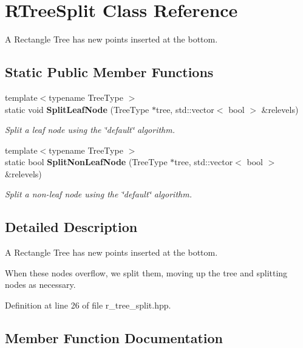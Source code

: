 \section{R\+Tree\+Split Class Reference}
\label{classmlpack_1_1tree_1_1RTreeSplit}


A Rectangle Tree has new points inserted at the bottom.  


\subsection*{Static Public Member Functions}
\begin{DoxyCompactItemize}
\item 
{\footnotesize template$<$typename Tree\+Type $>$ }\\static void \textbf{ Split\+Leaf\+Node} (Tree\+Type $\ast$tree, std\+::vector$<$ bool $>$ \&relevels)
\begin{DoxyCompactList}\small\item\em Split a leaf node using the \char`\"{}default\char`\"{} algorithm. \end{DoxyCompactList}\item 
{\footnotesize template$<$typename Tree\+Type $>$ }\\static bool \textbf{ Split\+Non\+Leaf\+Node} (Tree\+Type $\ast$tree, std\+::vector$<$ bool $>$ \&relevels)
\begin{DoxyCompactList}\small\item\em Split a non-\/leaf node using the \char`\"{}default\char`\"{} algorithm. \end{DoxyCompactList}\end{DoxyCompactItemize}


\subsection{Detailed Description}
A Rectangle Tree has new points inserted at the bottom. 

When these nodes overflow, we split them, moving up the tree and splitting nodes as necessary. 

Definition at line 26 of file r\+\_\+tree\+\_\+split.\+hpp.



\subsection{Member Function Documentation}
\mbox{\label{classmlpack_1_1tree_1_1RTreeSplit_af73652d9536a1715364bbb0e4a9ba04e}} 
